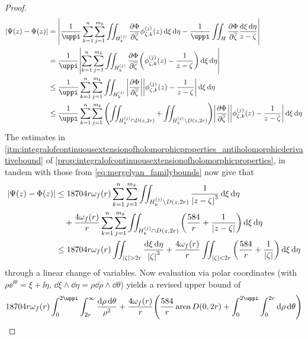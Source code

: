 \begin{proof}
    \begin{align*}
        \abs{\Psi(z)-\Phi(z)} & =\abs{\frac{1}{\uppi}\sum_{k=1}^n\sum_{j=1}^{m_k}\iint_{H_k^{(j)}}\pdv{\Phi}{\overline{\zeta}}\phi_{\zeta,k}^{(j)}(z)\dd{\xi}\dd{\eta}-\frac1\uppi\iint_H\pdv{\Phi}{\overline{\zeta}}\frac{\dd{\xi}\dd{\eta}}{z-\zeta}} \\
        & =\frac1{\uppi}\abs{\sum_{k=1}^n\sum_{j=1}^{m_k}\iint_{H_k^{(j)}}\pdv{\Phi}{\overline{\zeta}}\qty(\phi_{\zeta,k}^{(j)}(z)-\frac{1}{z-\zeta})\dd{\xi}\dd{\eta}}                                                           \\
        & \leq\frac1{\uppi}\sum_{k=1}^n\sum_{j=1}^{m_k}\iint_{H_k^{(j)}}\abs{\pdv{\Phi}{\overline{\zeta}}}\abs{\phi_{\zeta,k}^{(j)}(z)-\frac{1}{z-\zeta}}\dd{\xi}\dd{\eta}                                                        \\
        & \leq\frac{1}{\uppi}\sum_{k=1}^n\sum_{j=1}^{m_k}\qty(\iint_{H_k^{(j)}\cap D(z,2r)}+\iint_{H_k^{(j)}\setminus D(z,2r)})\abs{\pdv{\Phi}{\overline{\zeta}}}\abs{\phi_{\zeta,k}^{(j)}(z)-\frac{1}{z-\zeta}}\dd{\xi}\dd{\eta}
    \end{align*}
    The estimates in \cref{itm:integralofcontinuousextensionofholomorphicproperties_antiholomorphicderivativebound} of \cref{prop:integralofcontinuousextensionofholomorphicproperties}, in tandem with those from \cref{eq:mergelyan_familybounds} now give that
    \begin{align*}
        \abs{\Psi(z)-\Phi(z)} & \leq 18704r\omega_f(r)\sum_{k=1}^n\sum_{j=1}^{m_k}\iint_{H_k^{(j)}\setminus D(z,2r)}\frac{1}{\abs{z-\zeta}^3}\dd{\xi}\dd{\eta}                                                           \\
        & \quad+\frac{4\omega_f(r)}{r}\sum_{k=1}^n\sum_{j=1}^{m_k}\iint_{H_k^{(j)}\cap D(z,2r)}\qty(\frac{584}r+\frac{1}{\abs{z-\zeta}})\dd{\xi}\dd{\eta}                                          \\
        & \leq 18704r\omega_f(r)\iint_{\abs{\zeta}>2r}\frac{\dd{\xi}\dd{\eta}}{\abs{\zeta}^3}+\frac{4\omega_f(r)}{r}\iint_{\abs{\zeta}<2r}\qty(\frac{584}r+\frac{1}{\abs{\zeta}})\dd{\xi}\dd{\eta}
    \end{align*}
    through a linear change of variables. Now evaluation via polar coordinates (with \(\rho\ee^{\ii\theta}=\xi+\ii\eta\), \(\dd{\xi}\wedge\dd{\eta}=\rho\dd{\rho}\wedge\dd{\theta}\)) yields a revised upper bound of
    \begin{multline*}
        18704r\omega_f(r)\int_0^{2\uppi}\int_{2r}^\infty\frac{\dd{\rho}\dd{\theta}}{\rho^2}+\frac{4\omega_f(r)}{r}\qty(\frac{584}{r}\operatorname{area}D(0,2r)+\int_0^{2\uppi}\int_0^{2r}\dd{\rho}\dd{\theta})\\

\end{multline*}
\end{proof}
